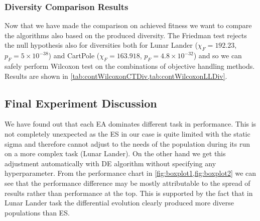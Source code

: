 \begin{table}[ht]
	\centering
	\scriptsize
	\setlength{\tabcolsep}{4pt}
	\renewcommand{\arraystretch}{1.15}
	\resizebox{\textwidth}{!}{%
	
}
	\caption{Fitness Wilcoxon test over objectives handlers for CartPole ($HL_x$ - direction on algorithm x, $p_x$ - p-value on algorithm x)}
	\label{tab:contWilcoxonCT}
\end{table}
\subsubsection{Diversity Comparison Results}
Now that we have made the comparison on achieved fitness we want to compare the algorithms also based on the produced diversity.
The Friedman test rejects the null hypothesis also for diversities both for Lunar Lander ($ \chi_F = 192.23 $, $ p_F = 5 \times 10^{-38} $) and CartPole ($ \chi_F = 163.918 $, $ p_F = 4.8 \times 10^{-32} $) and so we can safely perform Wilcoxon test on the combinations of objective handling methods. Results are shown in \cref{tab:contWilcoxonCTDiv,tab:contWilcoxonLLDiv}.

\begin{table}[ht]
	\centering
	\scriptsize
	\setlength{\tabcolsep}{4pt}
	\renewcommand{\arraystretch}{1.15}
	\resizebox{\textwidth}{!}{%
		
		
	}
	\caption{Diversity Wilcoxon test over objectives handlers for CartPole .($HL_x$ - direction on algorithm x, $p_x$ - p-value on algorithm x)}
	\label{tab:contWilcoxonCTDiv}
\end{table}

\begin{table}[ht]
	\centering
	\scriptsize
	\setlength{\tabcolsep}{4pt}
	\renewcommand{\arraystretch}{1.15}
	\resizebox{\textwidth}{!}{%
		
	}
	\caption{Diversity Wilcoxon test over objectives handlers for Lunar Lander. ($HL_x$ - direction on algorithm x, $p_x$ - p-value on algorithm x)}
	\label{tab:contWilcoxonLLDiv}
\end{table}
\newpage
\subsection{Final Experiment Discussion}
We have found out that each EA dominates different task in performance. This is not completely unexpected as the ES in our case is quite limited with the static sigma and therefore cannot adjust to the needs of the population during its run on a more complex task (Lunar Lander). On the other hand we get this adjustment automatically with DE algorithm without specifying any hyperparameter. From the performance chart in \cref{fig:boxplot1,fig:boxplot2} we can see that the performance difference may be mostly attributable to the spread of results rather than performance at the top.
This is supported by the fact that in Lunar Lander task the differential evolution clearly produced more diverse populations than ES.


